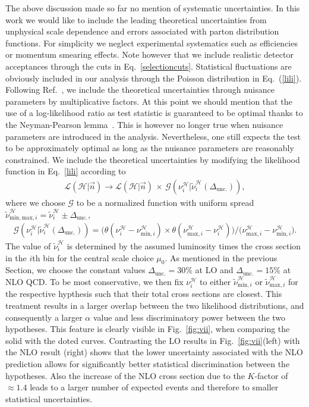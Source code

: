 \documentclass[preprint]{JHEP3}
\newcommand{\be}{\begin{eqnarray}}
\newcommand{\ee}{\end{eqnarray}}
\begin{document}
The above discussion made so far no mention of systematic uncertainties.
In this work we would like to include the leading theoretical uncertainties from unphysical scale dependence and errors associated with parton distribution functions.
For simplicity we neglect experimental systematics such as efficiencies or momentum smearing effects.
Note however that we include realistic detector acceptances through the cuts in Eq.~\ref{selectioncuts}.
Statistical fluctuations are obviously included in our analysis through the Poisson distribution in Eq.~(\ref{lili}).
Following Ref.~\cite{Conway:2011in}, we include the theoretical uncertainties through nuisance parameters by multiplicative factors.
At this point we should mention that the use of a log-likelihood ratio as test statistic is guaranteed to be optimal 
thanks to the Neyman-Pearson lemma~\cite{NeymanPearsonLemma}.
This is however no longer true when nuisance parameters are introduced in the analysis. 
Nevertheless, one still expects the test to be approximately optimal as long as the nuisance parameters are reasonably constrained.
We include the theoretical uncertainties by modifying the likelihood function in Eq.~\ref{lili} according to
\be
  \mathcal{L}(\mathcal{H}|\vec{n}) \to \mathcal{L}(\mathcal{H}|\vec{n})  \,\times\, \mathcal{G} \left( \nu_i^\mathcal{H} | \tilde{\nu}_i^\mathcal{H}(\Delta_\mathrm{unc.}) \right),
\ee
where we choose $\mathcal{G}$ to be a normalized function with uniform spread $\tilde{\nu}_{\mathrm{min,max},i}^\mathcal{H} = \tilde{\nu}_i^\mathcal{H} \pm \Delta_\mathrm{unc.}$,
\be
  \mathcal{G} \left( \nu_i^\mathcal{H} | \tilde{\nu}_i^\mathcal{H}(\Delta_\mathrm{unc.}) \right) = 
  \big( \theta\left( {\nu}_i^\mathcal{H} - \nu_{\mathrm{min},i}^\mathcal{H}  \right) 
      \times  \theta\left( \nu_{\mathrm{max},i}^\mathcal{H} - {\nu}_i^\mathcal{H} \right)  \big) 
  \big/ \big( \nu_{\mathrm{max},i}^\mathcal{H} - \nu_{\mathrm{min},i}^\mathcal{H}  \big).
\ee
The value of $\tilde{\nu}_i^\mathcal{H}$ is determined by the assumed luminosity times the cross section in the $i$th bin 
for the central scale choice $\mu_0$.
As mentioned in the previous Section, we choose the constant values $\Delta_\mathrm{unc.} = 30\%$ at LO
and $\Delta_\mathrm{unc.} = 15\%$ at NLO QCD.
To be most conservative, we then fix $\nu_i^\mathcal{H}$ to either $\tilde{\nu}_{\mathrm{min},i}^\mathcal{H}$ or $\tilde{\nu}_{\mathrm{max},i}^\mathcal{H}$
for the respective hypthesis such that their total cross sections are closest.
This treatment results in a larger overlap between the two likelihood distributions, 
and consequently a larger $\alpha$ value and less discriminatory power between the two hypotheses. 
This feature is clearly visible in Fig.~\ref{fig:vii}, when comparing the solid with the doted curves. 
Contrasting the LO results in Fig.~\ref{fig:vii}(left) with the NLO result (right) shows that 
the lower uncertainty associated with the NLO prediction allows for significantly better statistical discrimination between the hypotheses.
Also the increase of the NLO cross section due to the $K$-factor of $\approx1.4$ leads to a larger number of expected events and therefore 
to smaller statistical uncertainties.
\end{document}
